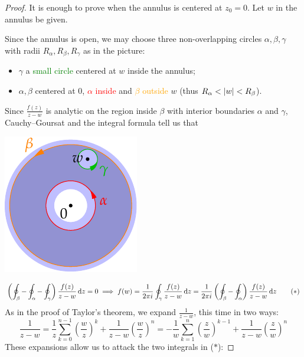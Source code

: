 \begin{proof}
	It is enough to prove when the annulus is centered at $z_0=0$. Let $w$ in the annulus be given.\par
	\begin{minipage}[t]{0.73\linewidth}\vspace{-3pt}
		Since the annulus is open, we may choose three non-overlapping circles $\alpha,\beta,\gamma$ with radii $R_\alpha,R_\beta,R_\gamma$ as in the picture:
		\begin{itemize}
		  \item $\gamma$ a \textcolor{Green}{small circle} centered at $w$ inside the annulus;
		  \item $\alpha,\beta$ centered at 0, \textcolor{red}{$\alpha$ inside} and \textcolor{orange}{$\beta$ outside} $w$ (thus $R_\alpha<\left| w\right|<R_\beta$). 
		\end{itemize}
		Since $\frac{f(z)}{z-w}$ is analytic on the region inside $\beta$ with interior boundaries $\alpha$ and $\gamma$, Cauchy--Goursat and the integral formula tell us that
	\end{minipage}
	\hfill
	\begin{minipage}[t]{0.25\linewidth}\vspace{-4pt}
		\flushright\includegraphics[scale=0.95]{laurent4}
	\end{minipage}\par
	\[
		\left(\oint_\beta-\oint_\alpha-\oint_\gamma\right)\frac{f(z)}{z-w}\,{\mathrm{d} z}=0\implies f(w)=\frac 1{2\pi i}\oint_\gamma\frac{f(z)}{z-w}\,{\mathrm{d} z} =\frac 1{2\pi i}\left(\oint_\beta-\oint_\alpha\right)\frac{f(z)}{z-w}\,{\mathrm{d} z}
		\tag{$\ast$}
	\]
	As in the proof of Taylor's theorem, we expand $\frac 1{z-w}$, this time in two ways:
	\[
		\frac 1{z-w}
		=\frac 1z\sum_{k=0}^{n-1}\left(\frac wz\right)^k +\frac 1{z-w}\left(\frac wz\right)^n 
		=-\frac 1w\sum_{k=1}^{n}\left(\frac zw\right)^{k-1} +\frac 1{z-w}\left(\frac zw\right)^n
	\]
	These expansions allow us to attack the two integrals in ($\ast$):

\end{proof}
